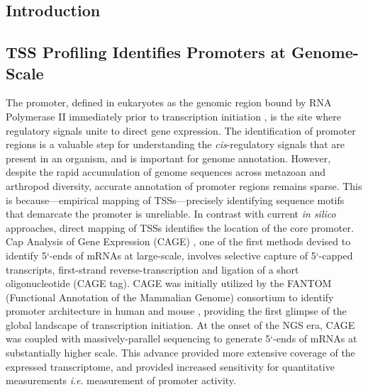\documentclass[runningheads,a4paper]{llncs}
\begin{document}
\begin{linenumbers}
\section{Introduction}

\subsection{TSS Profiling Identifies Promoters at Genome-Scale}
The promoter, defined in eukaryotes as the genomic region bound by RNA Polymerase II immediately prior to transcription initiation \cite{Kadonaga:2011gz}, is the site where regulatory signals unite to direct gene expression.
The identification of promoter regions is a valuable step for understanding the \textit{cis}-regulatory signals that are present in an organism, and is important for genome annotation.
However, despite the rapid accumulation of genome sequences across metazoan and arthropod diversity, accurate annotation of promoter regions remains sparse. 
This is because---empirical mapping of TSSs---precisely identifying sequence motifs that demarcate the promoter is unreliable.
In contrast with current \textit{in silico} approaches, direct mapping of TSSs identifies the location of the core promoter.
Cap Analysis of Gene Expression (CAGE) \cite{Kodzius:2006gy}, one of the first methods devised to identify 5`-ends of mRNAs at large-scale, involves selective capture of 5`-capped transcripts, first-strand reverse-transcription and ligation of a short oligonucleotide (CAGE tag). 
CAGE was initially utilized by the FANTOM (Functional Annotation of the Mammalian Genome) consortium to identify promoter architecture in human and mouse \cite{Carninci:2005kp}, providing the first glimpse of the global landscape of transcription initiation.
At the onset of the NGS era, CAGE was coupled with massively-parallel sequencing to generate 5`-ends of mRNAs at substantially higher scale. 
This advance provided more extensive coverage of the expressed transcriptome, and provided increased sensitivity for quantitative measurements \textit{i}.\textit{e}. measurement of promoter activity.


\end{linenumbers}
\end{document}
